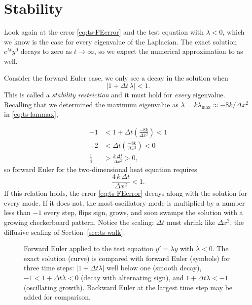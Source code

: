 \section{Stability}
\label{sec:ts-stability}

Look again at the error \eqref{eq:ts-FEerror} and the test equation with
$\lambda < 0$, which we know is the case for every eigenvalue of the
Laplacian. The exact solution $e^{\lambda t}y^0$ decays to zero as $t\to\infty$, so we expect the numerical approximation to as well.

Consider the forward Euler case, we only see a decay in the solution when 
\begin{equation}
  \left|1 + \Delta t\,\lambda\right| < 1.
  \label{eq:ts-FEstab}
\end{equation}
This is called a \emph{stability restriction} and it must hold for \emph{every}
eigenvalue. Recalling that we determined the maximum eigenvalue as $\lambda = k\lambda_{\max} \approx -8k/\Delta x^2$ in \eqref{eq:ts-lammax}, 

\begin{align*}
  -1 &< 1 + \Delta t\left(\frac{-8k}{\Delta x^2}\right) < 1 \\
  -2 &< \Delta t\left(\frac{-8k}{\Delta x^2}\right) < 0 \\
  \frac14 &> \frac{k\,\Delta t}{\Delta x^2} > 0,
\end{align*}
so forward Euler for the two-dimensional heat equation requires
\begin{equation}
  \boxed{\frac{4\,k\,\Delta t}{\Delta x^2} < 1.}
  \label{eq:ts-FElimit}
\end{equation}
If this relation holds, the error \eqref{eq:ts-FEerror} decays along with the
solution for every mode. If it does not, the most oscillatory mode is multiplied
by a number less than $-1$ every step, flips sign, grows, and soon swamps
the solution with a growing checkerboard pattern. Notice the scaling: $\Delta t$ must shrink like $\Delta x^2$, the
diffusive scaling of Section~\ref{sec:ts-walk}.

\begin{figure}[htbp]
  \centering
  \TSfigplaceholder{5.5cm}
  \caption{Forward Euler applied to the test equation $y' = \lambda y$ with $\lambda<0$. The exact solution (curve) is compared with forward Euler (symbols) for three time steps: $|1+\Delta t\lambda|$ well below one (smooth decay), $-1 < 1+\Delta t\lambda < 0$ (decay with alternating sign), and $1+\Delta t\lambda < -1$ (oscillating growth). Backward Euler at the largest time step may be added for comparison.}
  \label{fig:ts-decay}
\end{figure}

